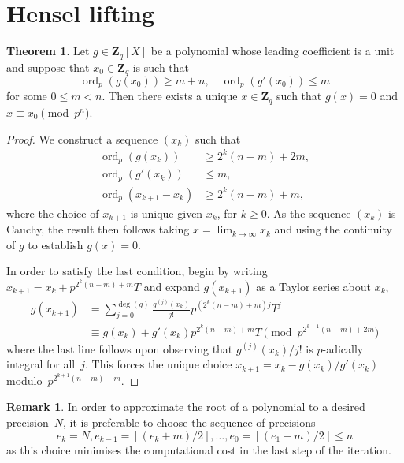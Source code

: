 \documentclass[a4paper,11pt]{article}
\theoremstyle{definition}
\newtheorem{thm}{Theorem}
\newtheorem{rem}{Remark}
\DeclareMathOperator{\ord}{ord}
\providecommand{\ceil}[1]{\left\lceil#1\right\rceil}%
\begin{document}
\section{Hensel lifting}

\begin{thm} \label{thm:Hensel1}
Let $g \in \mathbf{Z}_q[X]$ be a polynomial whose leading coefficient 
is a unit and suppose that $x_0 \in \mathbf{Z}_q$ is such that 
\begin{equation*}
\ord_p(g(x_0)) \geq m + n, \quad \ord_p(g'(x_0)) \leq m
\end{equation*}
for some $0 \leq m < n$.  Then there exists a unique $x \in \mathbf{Z}_q$ 
such that $g(x) = 0$ and $x \equiv x_0 \pmod{p^n}$.
\end{thm}

\begin{proof}
We construct a sequence $(x_k)$ such that 
\begin{align*}
\ord_p(g(x_k)) & \geq 2^k (n - m) + 2m, \\
\ord_p(g'(x_k)) & \leq m, \\
\ord_p(x_{k+1} - x_k) & \geq 2^k (n-m) + m, 
\end{align*}
where the choice of $x_{k+1}$ is unique given $x_k$, for $k \geq 0$.  
As the sequence $(x_k)$ is Cauchy, the result then follows taking 
$x = \lim_{k \to \infty} x_k$ and using the continuity of $g$ to 
establish $g(x) = 0$.

In order to satisfy the last condition, begin by writing 
$x_{k+1} = x_k + p^{2^k(n-m) + m} T$ and expand $g(x_{k+1})$ 
as a Taylor series about $x_k$, 
\begin{align*}
g(x_{k+1}) & = \sum_{j=0}^{\deg(g)} \frac{g^{(j)}(x_k)}{j!} p^{(2^k(n-m) + m) j} T^j \\
           & \equiv g(x_k) + g'(x_k) p^{2^k(n-m) + m} T \pmod{p^{2^{k+1}(n-m)+2m}}
\end{align*}
where the last line follows upon observing that $g^{(j)}(x_k) / j!$ 
is $p$-adically integral for all~$j$.  This forces the unique choice 
$x_{k+1} = x_k - g(x_k) / g'(x_k)$ modulo~${p^{2^{k+1}(n-m) + m}}$.
\end{proof}

\begin{rem}
In order to approximate the root of a polynomial to a desired 
precision~$N$, it is preferable to choose the sequence of 
precisions 
\begin{equation*}
e_{k} = N, e_{k-1} = \ceil{(e_k + m) / 2}, \dotsc, 
e_0 = \ceil{(e_1 + m) / 2} \leq n
\end{equation*}
as this choice minimises the computational cost in the last 
step of the iteration.
\end{rem}
\end{document}
